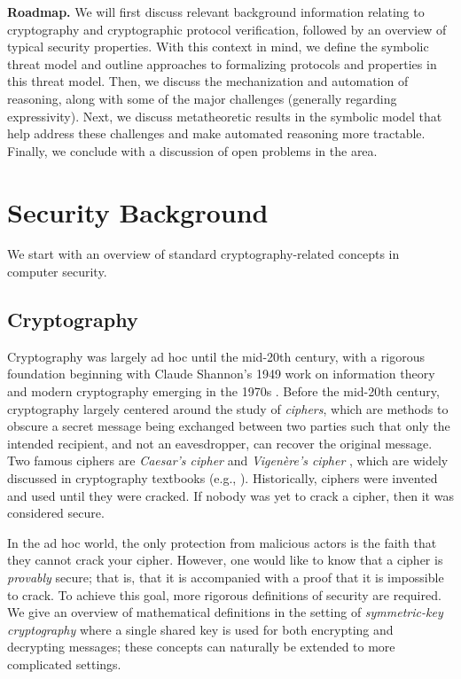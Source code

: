 \documentclass{article}
\theoremstyle{definition}
\begin{document}
\textbf{Roadmap.} We will first discuss relevant background information relating to cryptography 
and cryptographic protocol verification, followed by an overview of typical security properties. 
With this context in mind, we define the symbolic threat model and outline approaches to formalizing 
protocols and properties in this threat model. Then, we discuss the mechanization and automation of reasoning, 
along with some of the major challenges (generally regarding expressivity). 
Next, we discuss metatheoretic results in the symbolic model 
that help address these challenges and make automated reasoning more tractable. 
Finally, we conclude with a discussion of open problems in the area.

\section{Security Background}\label{sec:crypto-background}
We start with an overview of standard cryptography-related concepts in computer security.
\subsection{Cryptography}
Cryptography was largely ad hoc until the mid-20th century, 
with a rigorous foundation beginning with Claude Shannon's 1949 work on information theory \cite{shannon} and modern 
cryptography emerging in the 1970s \cite{diffiehellman,rsa}.
Before the mid-20th century, cryptography largely centered around the study of \textit{ciphers}, 
which are methods to obscure a secret message being exchanged between two parties such that only the intended recipient, 
and not an eavesdropper, can recover the original message. 
Two famous ciphers are \textit{Caesar's cipher} \cite{textbook} and \textit{Vigenère's cipher} \cite{textbook}, 
which are widely discussed in cryptography textbooks (e.g., \cite{textbook}). 
Historically, ciphers were invented and used until they were cracked. 
If nobody was yet to crack a cipher, then it was considered secure.

In the ad hoc world, the only protection from malicious actors is the faith that they cannot crack your cipher. 
However, one would like to know that a cipher is \textit{provably} secure; 
that is, that it is accompanied with a proof that it is impossible to crack.
To achieve this goal, more rigorous definitions of security are required. 
We give an overview of mathematical definitions in the setting of \textit{symmetric-key cryptography} 
where a single shared key is used for both encrypting and decrypting messages; 
these concepts can naturally be extended to more complicated settings.
\end{document}
